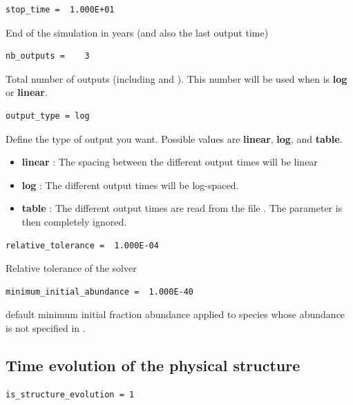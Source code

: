 \documentclass[english,a4paper,twoside]{article}
\begin{document}
\begin{verbatim}
stop_time =  1.000E+01
\end{verbatim}
End of the simulation in years (and also the last output time)

\begin{verbatim}
nb_outputs =    3
\end{verbatim}
Total number of outputs (including  and ). This number will be used when  is \textbf{log} or \textbf{linear}.

\begin{verbatim}
output_type = log
\end{verbatim}
Define the type of output you want. Possible values are \textbf{linear}, \textbf{log}, and \textbf{table}. 
\begin{itemize}
\item \textbf{linear} : The spacing between the different output times will be linear
\item \textbf{log} : The different output times will be log-spaced.
\item \textbf{table} : The different output times are read from the file . The parameter  is then completely ignored.
\end{itemize}

\begin{verbatim}
relative_tolerance =  1.000E-04
\end{verbatim}
Relative tolerance of the solver

\begin{verbatim}
minimum_initial_abundance =  1.000E-40
\end{verbatim}
default minimum initial fraction abundance applied to species whose abundance is not specified in .

\subsection{Time evolution of the physical structure}\label{sec:time_structure}
\begin{verbatim}
is_structure_evolution = 1
\end{verbatim}
\end{document}
